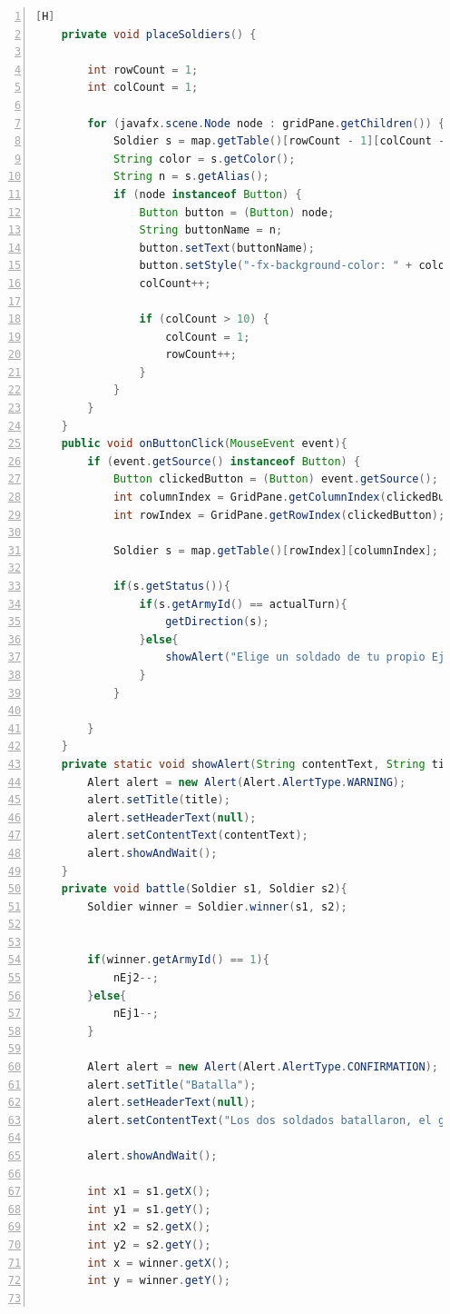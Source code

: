 \documentclass{article}
\begin{document}
\begin{lstlisting}[language=java,caption={Clase controladora}, numbers=left][H]
    private void placeSoldiers() {

        int rowCount = 1;
        int colCount = 1;

        for (javafx.scene.Node node : gridPane.getChildren()) {
            Soldier s = map.getTable()[rowCount - 1][colCount - 1];
            String color = s.getColor();
            String n = s.getAlias();
            if (node instanceof Button) {
                Button button = (Button) node;
                String buttonName = n;
                button.setText(buttonName);
                button.setStyle("-fx-background-color: " + color);
                colCount++;

                if (colCount > 10) {
                    colCount = 1;
                    rowCount++;
                }
            }
        }
    }
    public void onButtonClick(MouseEvent event){
        if (event.getSource() instanceof Button) {
            Button clickedButton = (Button) event.getSource();
            int columnIndex = GridPane.getColumnIndex(clickedButton);
            int rowIndex = GridPane.getRowIndex(clickedButton);

            Soldier s = map.getTable()[rowIndex][columnIndex];

            if(s.getStatus()){
                if(s.getArmyId() == actualTurn){
                    getDirection(s);
                }else{
                    showAlert("Elige un soldado de tu propio Ejercito", "Error");
                }
            }

        }
    }
    private static void showAlert(String contentText, String title) {
        Alert alert = new Alert(Alert.AlertType.WARNING);
        alert.setTitle(title);
        alert.setHeaderText(null);
        alert.setContentText(contentText);
        alert.showAndWait();
    }
    private void battle(Soldier s1, Soldier s2){
        Soldier winner = Soldier.winner(s1, s2);


        if(winner.getArmyId() == 1){
            nEj2--;
        }else{
            nEj1--;
        }

        Alert alert = new Alert(Alert.AlertType.CONFIRMATION);
        alert.setTitle("Batalla");
        alert.setHeaderText(null);
        alert.setContentText("Los dos soldados batallaron, el ganador fue: " + winner.getName());

        alert.showAndWait();

        int x1 = s1.getX();
        int y1 = s1.getY();
        int x2 = s2.getX();
        int y2 = s2.getY();
        int x = winner.getX();
        int y = winner.getY();


\end{lstlisting}
\end{document}
